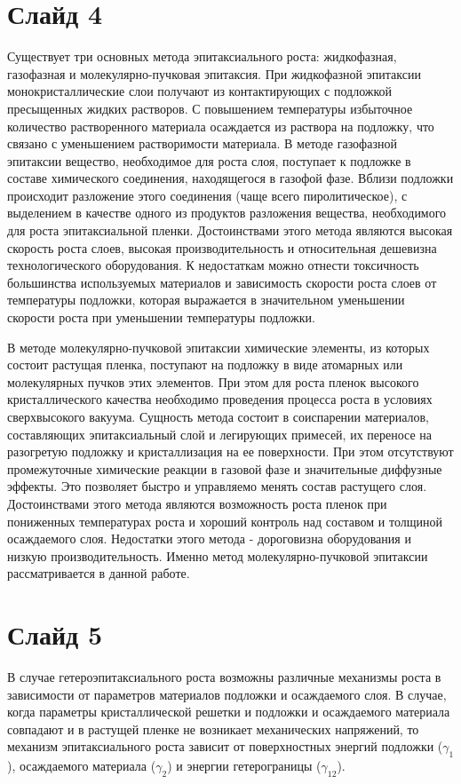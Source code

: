 \section*{Слайд 4}
Существует три основных метода эпитаксиального роста: жидкофазная, газофазная и молекулярно-пучковая эпитаксия. При жидкофазной эпитаксии монокристаллические слои получают из контактирующих с подложкой пресыщенных жидких растворов. С повышением температуры избыточное количество растворенного материала осаждается из раствора на подложку, что связано с уменьшением растворимости материала. 
В методе газофазной эпитаксии вещество, необходимое для роста слоя, поступает к подложке в составе химического соединения, находящегося в газофой фазе. Вблизи подложки происходит разложение этого соединения (чаще всего пиролитическое), с выделением в качестве одного из продуктов разложения вещества, необходимого для роста эпитаксиальной пленки. Достоинствами этого метода являются высокая скорость роста слоев, высокая производительность и относительная дешевизна технологического оборудования. К недостаткам можно отнести токсичность большинства используемых материалов и зависимость скорости роста слоев от температуры подложки, которая выражается в значительном уменьшении скорости роста при уменьшении температуры подложки. 

В методе молекулярно-пучковой эпитаксии химические элементы, из которых состоит растущая пленка, поступают на подложку в виде атомарных или молекулярных пучков этих элементов. При этом для роста пленок высокого кристаллического качества необходимо проведения процесса роста в условиях сверхвысокого вакуума. Сущность метода состоит в соиспарении материалов, составляющих эпитаксиальный слой и легирующих примесей, их переносе на разогретую подложку и кристаллизация на ее поверхности. При этом отсутствуют промежуточные химические реакции в газовой фазе и значительные диффузные эффекты. Это позволяет быстро и управляемо менять состав растущего слоя. Достоинствами этого метода являются возможность роста пленок при пониженных температурах роста и хороший контроль над составом и толщиной осаждаемого слоя. Недостатки этого метода - дороговизна оборудования и низкую производительность. Именно метод молекулярно-пучковой эпитаксии рассматривается в данной работе.
\section*{Слайд 5}
В случае гетероэпитаксиального роста возможны различные механизмы роста в зависимости от параметров материалов подложки и осаждаемого слоя. В случае, когда параметры кристаллической решетки и подложки и осаждаемого материала совпадают и в растущей пленке не возникает механических напряжений, то механизм эпитаксиального роста зависит от поверхностных энергий подложки ($\gamma_1$ ), осаждаемого материала ($\gamma_2$) и энергии гетерограницы ($\gamma_{12}$).

